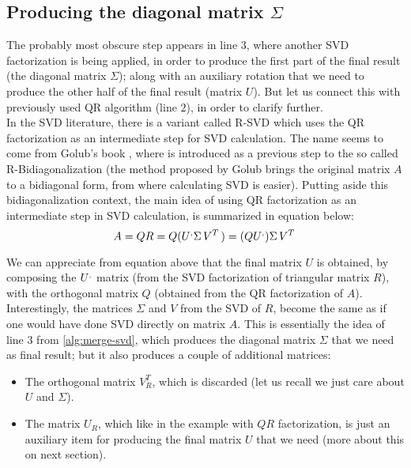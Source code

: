 \subsection{Producing the diagonal matrix $\Sigma$}

The probably most obscure step appears in line $3$, where another SVD
factorization is being applied, in order to produce the first part of
the final result (the diagonal matrix $\Sigma$); along with an
auxiliary rotation that we need to 
produce the other half of the final result (matrix $U$). But let us connect
this with previously used QR algorithm (line $2$), in order to clarify
further. \\

In the SVD literature, there is a variant called R-SVD which uses the
QR factorization as an intermediate step for SVD calculation. The
name seems to come from Golub's book \cite{golub13}, where is
introduced as a previous step to the so called R-Bidiagonalization
(the method proposed by Golub brings the original matrix $A$ to a
bidiagonal form, from where calculating SVD is easier). Putting aside
this bidiagonalization context, the main idea of using QR
factorization as an intermediate step in SVD calculation, is
summarized in equation below: \\

\begin{equation}
\label{eq:svd-qr}
A = QR = Q (\prim{U} \Sigma \trans{V}) = (Q \prim{U}) \Sigma \trans{V}
\end{equation}
\hfill

We can appreciate from equation above that the final matrix $U$ is
obtained, by composing the $\prim{U}$ matrix (from the SVD factorization
of triangular matrix $R$), with the orthogonal matrix  $Q$ (obtained from the
QR factorization of $A$). Interestingly, the matrices $\Sigma$ and $V$ from
the SVD of $R$, become the same as if one would have done SVD directly
on matrix $A$. This is essentially the idea of line $3$ from
\cref{alg:merge-svd}, which produces the diagonal matrix $\Sigma$ that
we need as final result; but it also produces a couple of additional matrices:

\begin{itemize}
  \item The orthogonal matrix $V_R^{T}$, which is discarded (let us
    recall we just care about $U$ and $\Sigma$). 
  \item The matrix $U_R$, which like in the example with $QR$
    factorization, is just an auxiliary item for producing the final
    matrix $U$ that we need (more about this on next section).
\end{itemize}
\hfill

